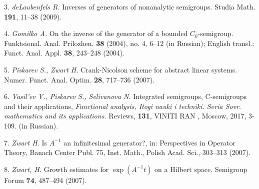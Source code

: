 3. {\it deLaubenfels R.} Inverses of generators of nonanalytic semigroups.
Studia Math. \textbf{191}, 11--38 (2009).

4. {\it Gomilko A.} On the inverse of the generator of a bounded $C_0$-semigroup.
Funktsional. Anal. Prilozhen. \textbf{38} (2004), no. 4, 6--12 (in Russian);
English transl.: Funct. Anal. Appl. \textbf{38}, 243--248 (2004).

5. {\it Piskarev S., Zwart H.} Crank-Nicolson scheme for abstract linear systems.
Numer. Funct. Anal. Optim. \textbf{28}, 717--736 (2007).

6. {\it  Vasil'ev V.,  Piskarev S.,  Selivanova N.}  Integrated semigroups, C-semigroups and their
applications, \emph{Functional analysis, Itogi nauki i techniki. Seria Sovr. mathematics and
its applications.} Reviews, \textbf{131}, VINITI RAN , Moscow, 2017, 3-109. (in Russian).

7. {\it  Zwart H.} Is $A^{-1}$ an infinitesimal generator?, in: Perspectives in Operator
Theory, Banach Center Publ. 75, Inst. Math., Polish Acad. Sci., 303--313 (2007).

8. { \it Zwart, H.} Growth estimates for $\exp(A^{-1}t)$ on a Hilbert space. Semigroup
Forum \textbf{74}, 487--494 (2007).

